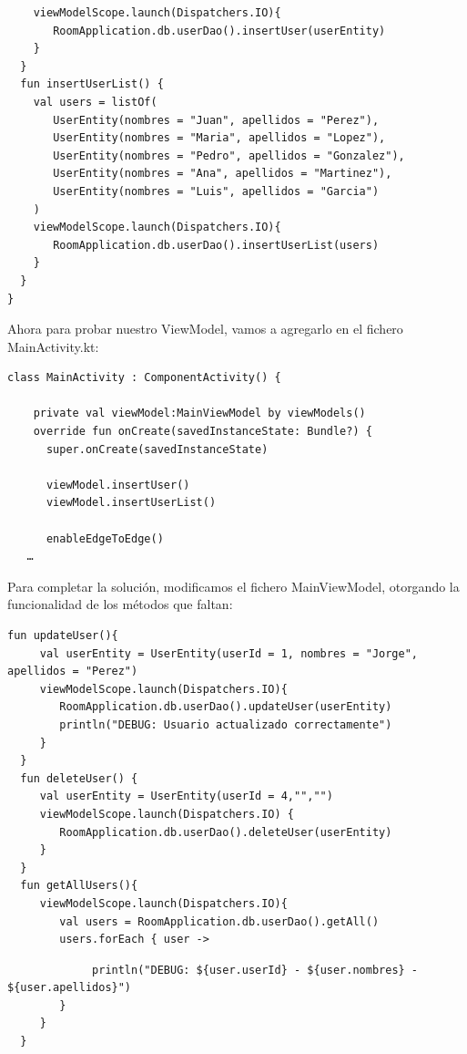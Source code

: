 \documentclass[10pt,letterpaper]{article}
\begin{document}
\newpage
\begin{lstlisting}
    viewModelScope.launch(Dispatchers.IO){
       RoomApplication.db.userDao().insertUser(userEntity)
    }
  }
  fun insertUserList() {
    val users = listOf(
       UserEntity(nombres = "Juan", apellidos = "Perez"),
       UserEntity(nombres = "Maria", apellidos = "Lopez"),
       UserEntity(nombres = "Pedro", apellidos = "Gonzalez"),
       UserEntity(nombres = "Ana", apellidos = "Martinez"),
       UserEntity(nombres = "Luis", apellidos = "Garcia")
    )
    viewModelScope.launch(Dispatchers.IO){
       RoomApplication.db.userDao().insertUserList(users)
    }
  }
}
\end{lstlisting}

Ahora para probar nuestro ViewModel, vamos a agregarlo en el fichero MainActivity.kt:

\begin{lstlisting}
class MainActivity : ComponentActivity() {

    private val viewModel:MainViewModel by viewModels()
    override fun onCreate(savedInstanceState: Bundle?) {
      super.onCreate(savedInstanceState)

      viewModel.insertUser()
      viewModel.insertUserList()

      enableEdgeToEdge()
   …
\end{lstlisting}

Para completar la solución, modificamos el fichero MainViewModel, otorgando la funcionalidad de los métodos que faltan:

\begin{lstlisting}
fun updateUser(){
     val userEntity = UserEntity(userId = 1, nombres = "Jorge", apellidos = "Perez")
     viewModelScope.launch(Dispatchers.IO){
        RoomApplication.db.userDao().updateUser(userEntity)
        println("DEBUG: Usuario actualizado correctamente")
     }
  }
  fun deleteUser() {
     val userEntity = UserEntity(userId = 4,"","")
     viewModelScope.launch(Dispatchers.IO) {
        RoomApplication.db.userDao().deleteUser(userEntity)
     }
  }
  fun getAllUsers(){
     viewModelScope.launch(Dispatchers.IO){
        val users = RoomApplication.db.userDao().getAll()
        users.forEach { user ->
\end{lstlisting}


\newpage
\begin{lstlisting}
             println("DEBUG: ${user.userId} - ${user.nombres} - ${user.apellidos}")
        }
     }
  }
\end{lstlisting}
\end{document}
